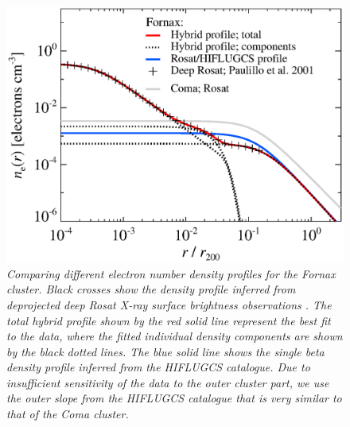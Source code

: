 \documentclass[10pt,aps,pra,reprint,amsmath,amsfonts,amssymb,showpacs,nofootinbib,floatfix]{revtex4-1}
\def\del#1{{}}
\begin{document}
\begin{figure}%
 \includegraphics[width=0.99\columnwidth]{figures/dens.fornax.eps}
 \caption{\it Comparing different electron number density profiles for
   the Fornax cluster. Black crosses show the density profile inferred
   from deprojected deep Rosat X-ray surface brightness observations
   \protect \cite{2002ApJ...565..883P}. The total hybrid profile shown
   by the red solid line represent the best fit to the data, where the
   fitted individual density components are shown by the black dotted
   lines. The blue solid line shows the single beta density profile
   inferred from the HIFLUGCS catalogue. Due to insufficient
   sensitivity of the data to the outer cluster part, we use the outer
   slope from the HIFLUGCS catalogue that is very similar to that of
   the Coma cluster.}
 \label{fig:dens_fornax}
\end{figure}

\del{
\section{Flux tables for the HIFLUGCS catalogue}
TO BE WRITTEN
}
\end{document}
